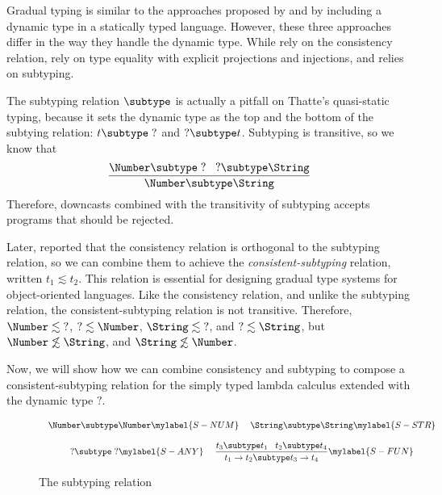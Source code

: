 Gradual typing is similar to the approaches proposed by
\citet{abadi1989dts} and \citet{thatte1990qst} by including a
dynamic type in a statically typed language.
However, these three approaches differ in the way they handle the
dynamic type.
While \citet{siek2006gradual} rely on the consistency relation,
\citet{abadi1989dts} rely on type equality with explicit projections
and injections, and \citet{thatte1990qst} relies on subtyping.

The subtyping relation $\subtype$ is actually a pitfall on Thatte's
quasi-static typing, because it sets the dynamic type
as the top and the bottom of the subtying relation:
$t \subtype \;?$ and $? \subtype t$.
Subtyping is transitive, so we know that
\[
\frac{\Number \subtype \;? \;\;\;
      ? \subtype \String}
     {\Number \subtype \String}
\]
Therefore, downcasts combined with the transitivity of subtyping
accepts programs that should be rejected.

Later, \citet{siek2007objects} reported that the consistency relation is
orthogonal to the subtyping relation, so we can combine them to achieve
the \emph{consistent-subtyping} relation, written $t_{1} \lesssim t_{2}$.
This relation is essential for designing gradual type systems for
object-oriented languages.
Like the consistency relation, and unlike the subtyping relation,
the consistent-subtyping relation is not transitive.
Therefore, $\Number \lesssim \;?$, $? \lesssim \Number$,
$\String \lesssim \;?$, and $? \lesssim \String$,
but $\Number \not\lesssim \String$, and
$\String \not\lesssim \Number$.

Now, we will show how we can combine consistency and subtyping
to compose a consistent-subtyping relation for the simply typed
lambda calculus extended with the dynamic type $?$.

\begin{figure}[!ht]
\dstart
$$
\begin{array}{c}
\begin{array}{c}
\Number \subtype \Number \mylabel{S-NUM}
\end{array}
\;
\begin{array}{c}
\String \subtype \String \mylabel{S-STR}
\end{array}
\\ \\
\begin{array}{c}
? \subtype \;? \mylabel{S-ANY}
\end{array}
\;
\begin{array}{c}
\dfrac{t_{3} \subtype t_{1} \;\;\; t_{2} \subtype t_{4}}
      {t_{1} \rightarrow t_{2} \subtype t_{3} \rightarrow t_{4}} \mylabel{S-FUN}
\end{array}
\end{array}
$$
\dend
\caption{The subtyping relation}
\label{fig:subtyping}
\end{figure}

